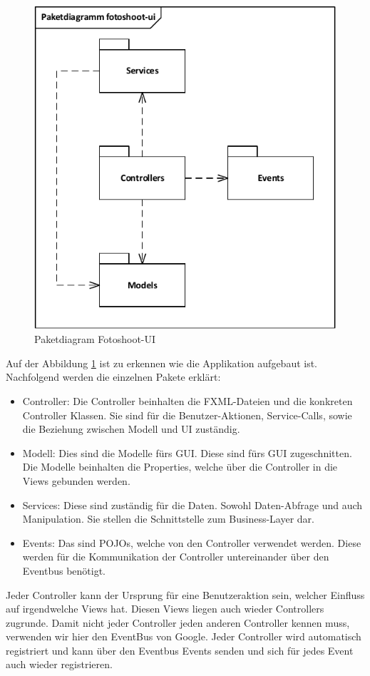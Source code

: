 \begin{figure}[h!]
	\centering
	\includegraphics[width=0.4\linewidth]{../../fig/fotoshoot-ui/fotoshoot-ui-paketdiagramm}
	\caption{Paketdiagram Fotoshoot-UI}
	\label{fig:fotoshoot-ui-paketdiagramm}
\end{figure}
		
Auf der Abbildung \ref{fig:fotoshoot-ui-paketdiagramm} ist zu erkennen wie die Applikation aufgebaut ist. Nachfolgend werden die einzelnen Pakete erklärt:
		
\begin{itemize}
	\item Controller: Die Controller beinhalten die FXML-Dateien und die konkreten Controller Klassen. Sie sind für die Benutzer-Aktionen, Service-Calls, sowie die Beziehung zwischen Modell und UI zuständig.
	\item Modell: Dies sind die Modelle fürs GUI. Diese sind fürs GUI zugeschnitten. Die Modelle beinhalten die Properties, welche über die Controller in die Views gebunden werden.
	\item Services: Diese sind zuständig für die Daten. Sowohl Daten-Abfrage und auch Manipulation. Sie stellen die Schnittstelle zum Business-Layer dar.
	\item Events: Das sind POJOs, welche von den Controller verwendet werden. Diese werden für die Kommunikation der Controller untereinander über den Eventbus benötigt.
\end{itemize}
			
Jeder Controller kann der Ursprung für eine Benutzeraktion sein, welcher Einfluss auf irgendwelche Views hat. Diesen Views liegen auch wieder Controllers zugrunde. Damit nicht jeder Controller jeden anderen Controller kennen muss, verwenden wir hier den EventBus von Google. Jeder Controller wird automatisch registriert und kann über den Eventbus Events senden und sich für jedes Event auch wieder registrieren.
